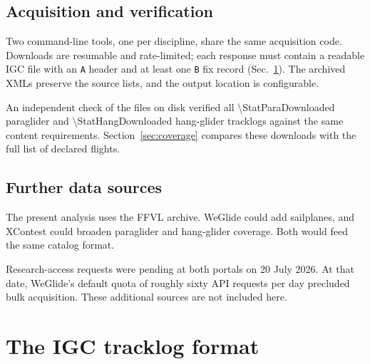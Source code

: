\subsection{Acquisition and verification}

Two command-line tools, one per discipline, share the same acquisition code. Downloads
are resumable and rate-limited; each response must contain a readable IGC file with an
\texttt{A} header and at least one \texttt{B} fix record (Sec.~\ref{sec:igcformat}).
The archived XMLs preserve the source lists, and the output location is configurable.

An independent check of the files on disk verified all
\num{\StatParaDownloaded} paraglider and \num{\StatHangDownloaded} hang-glider
tracklogs against the same content requirements. Section~\ref{sec:coverage}
compares these downloads with the full list of declared flights.

\subsection{Further data sources}
The present analysis uses the FFVL archive. WeGlide could add sailplanes, and
XContest could broaden paraglider and hang-glider coverage. Both would feed the
same catalog format.

Research-access requests were pending at both portals on 20 July 2026.
At that date, WeGlide's default quota of roughly sixty API requests per day
precluded bulk acquisition. These additional sources are not included here.

\section{The IGC tracklog format}
\label{sec:igcformat}

